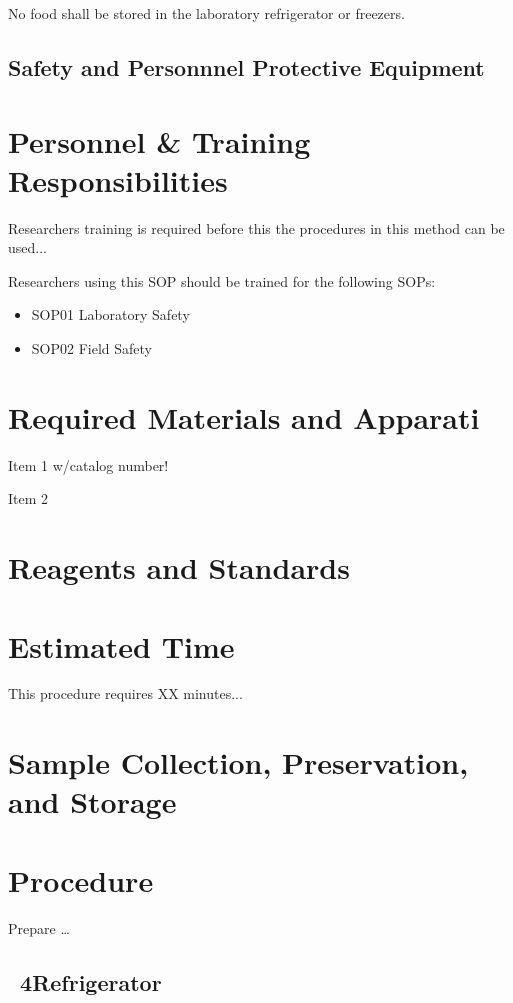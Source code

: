 \documentclass[12pt]{../SOP3_alpha}\usepackage[]{graphicx}\usepackage[]{xcolor}
\begin{document}
\NP No food shall be stored in the laboratory refrigerator or freezers.


\subsection*{Safety and Personnnel Protective Equipment}


\section{Personnel \& Training Responsibilities}

\NP Researchers training is required before this the procedures in this method can be used... 

\NP Researchers using this SOP should be trained for the following SOPs:

\begin{itemize}
  \item SOP01 Laboratory Safety
  \item SOP02 Field Safety
\end{itemize}

\section{Required Materials and Apparati}

\NP Item 1 w/catalog number!

\NP Item 2

\section{Reagents and Standards}

\section{Estimated Time}

\NP This procedure requires XX minutes...

\section{Sample Collection, Preservation, and Storage}

\section{Procedure}

\NP Prepare \dots
\subsection{~4\degree Refrigerator}
\end{document}
